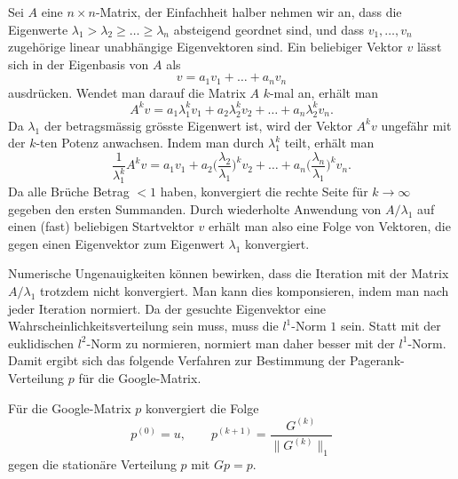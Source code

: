 Sei $A$ eine $n\times n$-Matrix, der Einfachheit halber nehmen wir an,
dass die Eigenwerte $\lambda_1>\lambda_2\ge \dots\ge \lambda_n$
absteigend geordnet sind,
und dass $v_1,\dots,v_n$ zugehörige linear unabhängige Eigenvektoren sind.
Ein beliebiger Vektor $v$ lässt sich in der Eigenbasis von $A$
als
\[
v = a_1v_1+\dots+a_nv_n
\]
ausdrücken.
Wendet man darauf die Matrix $A$ $k$-mal an, erhält man
\[
A^kv
=
a_1\lambda_1^k v_1 
+
a_2\lambda_2^k v_2
+
\dots
+
a_n\lambda_2^k v_n.
\]
Da $\lambda_1$ der betragsmässig grösste Eigenwert ist, wird der Vektor
$A^kv$ ungefähr mit der $k$-ten Potenz anwachsen.
Indem man durch $\lambda_1^k$ teilt, erhält man
\[
\frac{1}{\lambda_1^k} A^k v
=
a_1v_1
+
a_2\biggl(\frac{\lambda_2}{\lambda_1}\biggr)^k v_2
+
\dots
+
a_n\biggl(\frac{\lambda_n}{\lambda_1}\biggr)^k v_n.
\]
Da alle Brüche Betrag $<1$ haben, konvergiert die rechte Seite für $k\to\infty$
gegeben den  ersten Summanden.
Durch wiederholte Anwendung von $A/\lambda_1$ auf einen (fast) beliebigen
Startvektor $v$ erhält man also eine Folge von Vektoren, die gegen einen
Eigenvektor zum Eigenwert $\lambda_1$ konvergiert.

Numerische Ungenauigkeiten können bewirken, dass die Iteration mit der
Matrix $A/\lambda_1$ trotzdem nicht konvergiert.
Man kann dies komponsieren, indem man nach jeder Iteration normiert.
Da der gesuchte Eigenvektor eine Wahrscheinlichkeitsverteilung sein muss,
muss die $l^1$-Norm $1$ sein.
Statt mit der euklidischen $l^2$-Norm zu normieren, normiert man daher
besser mit der $l^1$-Norm.
Damit ergibt sich das folgende Verfahren zur Bestimmung der Pagerank-Verteilung
$p$ für die Google-Matrix.

\begin{satz}
Für die Google-Matrix $p$ konvergiert die Folge 
\[
p^{(0)} = u,
\qquad
p^{(k+1)} = \frac{G^{(k)}}{\| G^{(k)} \|_1}
\]
gegen die stationäre Verteilung $p$ mit $Gp=p$.
\end{satz}




